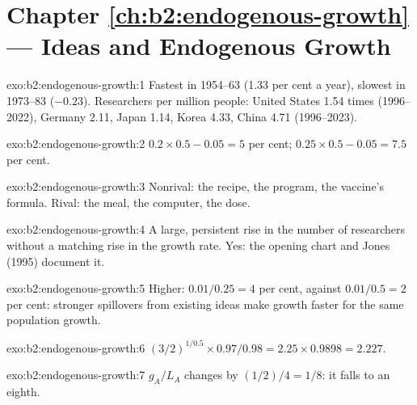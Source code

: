 \section*{Chapter \ref{ch:b2:endogenous-growth} --- Ideas and Endogenous Growth}

\begin{solution}{exo:b2:endogenous-growth:1}
Fastest in 1954--63 (1.33 per cent a year), slowest in 1973--83 ($-0.23$). Researchers per million people: United States 1.54 times (1996--2022), Germany 2.11, Japan 1.14,
Korea 4.33, China 4.71 (1996--2023).
\end{solution}

\begin{solution}{exo:b2:endogenous-growth:2}
$0.2 \times 0.5 - 0.05 = 5$ per cent; $0.25 \times 0.5 - 0.05 = 7.5$ per cent.
\end{solution}

\begin{solution}{exo:b2:endogenous-growth:3}
Nonrival: the recipe, the program, the vaccine's formula. Rival: the meal, the computer, the dose.
\end{solution}

\begin{solution}{exo:b2:endogenous-growth:4}
A large, persistent rise in the number of researchers without a matching rise in the growth rate. Yes: the opening chart
and Jones (1995) document it.
\end{solution}

\begin{solution}{exo:b2:endogenous-growth:5}
Higher: $0.01/0.25 = 4$ per cent, against $0.01/0.5 = 2$ per cent: stronger spillovers from existing ideas make growth faster for the same population growth.
\end{solution}

\begin{solution}{exo:b2:endogenous-growth:6}
$(3/2)^{1/0.5} \times 0.97/0.98 = 2.25 \times 0.9898 = 2.227$.
\end{solution}

\begin{solution}{exo:b2:endogenous-growth:7}
$g_A/L_A$ changes by $(1/2)/4 = 1/8$: it falls to an eighth.
\end{solution}

